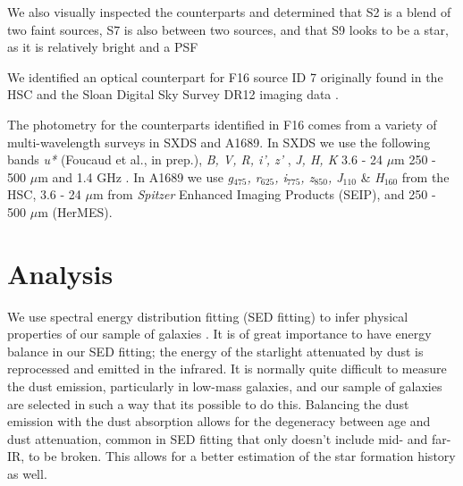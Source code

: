 \documentclass[preprint,natbib209]{aastex}
\begin{document}
We also visually inspected the counterparts and determined that S2 is a blend of two faint sources, S7 is also between two sources, and that S9 looks to be a star, as it is relatively bright and a PSF

We identified an optical counterpart for F16 source ID 7 originally found in the HSC and the Sloan Digital Sky Survey \citep[SDSS;][]{york2000} 
DR12 \citep{alam15} imaging data \citep{fukugita96, gunn98, hogg01, smith02, pier03, ivezic04, gunn06, tucker06, padmanabhan08, doi10}.

The photometry for the counterparts identified in F16 comes from a variety of multi-wavelength surveys in SXDS and A1689.
In SXDS we use the following bands \textit{u*} (Foucaud et al., in prep.), \textit{B, V, R, i', z'} \citep{furusawa08},
\textit{J, H, K} \citep[UKIDSS;\footnotemark][]{lawrence07} 3.6 - 24 $\mu$m \citep[SWIRE, SpUDS, SEDS;][]{lonsdale03, ashby13}
250 - 500 $\mu$m \citep[HerMES;][]{oliver12, smith12, wang14} and 1.4 GHz \citep{simpson06}.
In A1689 we use \textit{g$_{475}$, r$_{625}$, i$_{775}$, z$_{850}$, J$_{110}$} \& \textit{H}$_{160}$ from the HSC,
 3.6 - 24 $\mu$m from \textit{Spitzer} Enhanced Imaging Products (SEIP), and 250 - 500 $\mu$m (HerMES).


\section{Analysis}
\label{sec:analysis}

We use spectral energy distribution fitting (SED fitting) to infer physical properties of our sample of galaxies \citep[for a recent review of SED fitting see][]{conroy13}. It is of great importance to have energy balance in our SED fitting; the energy of the starlight attenuated by dust is reprocessed and emitted in the infrared. It is normally quite difficult to measure the dust emission, particularly in low-mass galaxies, and our sample of galaxies are selected in such a way that its possible to do this. Balancing the dust emission with the dust absorption allows for the degeneracy between age and dust attenuation, common in SED fitting that only doesn't include mid- and far-IR, to be broken. This allows for a better estimation of the star formation history as well.
\end{document}
